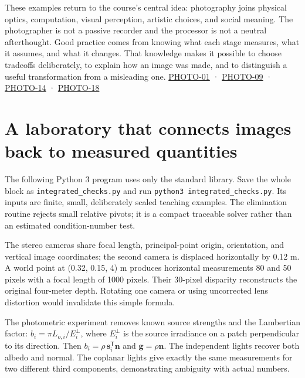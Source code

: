 These examples return to the course's central idea: photography joins physical optics, computation, visual perception, artistic choices, and social meaning. The photographer is not a passive recorder and the processor is not a neutral afterthought. Good practice comes from knowing what each stage measures, what it assumes, and what it changes. That knowledge makes it possible to choose tradeoffs deliberately, to explain how an image was made, and to distinguish a useful transformation from a misleading one. \hyperref[04-visual-computing-ii-ch036-photo-01---photography-session-01]{PHOTO-01} · \hyperref[04-visual-computing-ii-ch036-photo-09---photography-session-09]{PHOTO-09} · \hyperref[04-visual-computing-ii-ch036-photo-14---photography-session-14]{PHOTO-14} · \hyperref[04-visual-computing-ii-ch036-photo-18---photography-session-18]{PHOTO-18}

\section{A laboratory that connects images back to measured quantities}\label{04-visual-computing-ii-ch034-a-laboratory-that-connects-images-back-to-measured-quantities}

\hypertarget{04-visual-computing-ii-ch034-a-laboratory-that-connects-images-back-to-measured-quantities}{}

The following Python 3 program uses only the standard library. Save the whole block as \texttt{integrated\_checks.py} and run \texttt{python3\ integrated\_checks.py}. Its inputs are finite, small, deliberately scaled teaching examples. The elimination routine rejects small relative pivots; it is a compact traceable solver rather than an estimated condition-number test.

The stereo cameras share focal length, principal-point origin, orientation, and vertical image coordinates; the second camera is displaced horizontally by 0.12 m. A world point at (0.32, 0.15, 4) m produces horizontal measurements 80 and 50 pixels with a focal length of 1000 pixels. Their 30-pixel disparity reconstructs the original four-meter depth. Rotating one camera or using uncorrected lens distortion would invalidate this simple formula.

The photometric experiment removes known source strengths and the Lambertian factor: \(b_i=\pi L_{o,i}/E_i^\perp\), where \(E_i^\perp\) is the source irradiance on a patch perpendicular to its direction. Then \(b_i=\rho\,\mathbf s_i^\mathsf T\mathbf n\) and \(\mathbf g=\rho\mathbf n\). The independent lights recover both albedo and normal. The coplanar lights give exactly the same measurements for two different third components, demonstrating ambiguity with actual numbers.

